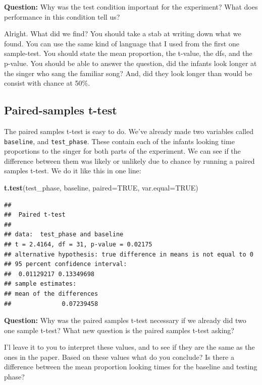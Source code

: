 \documentclass[]{book}
\newenvironment{Shaded}{\begin{snugshade}}{\end{snugshade}}
\newcommand{\KeywordTok}[1]{\textcolor[rgb]{0.13,0.29,0.53}{\textbf{{#1}}}}
\newcommand{\DataTypeTok}[1]{\textcolor[rgb]{0.13,0.29,0.53}{{#1}}}
\newcommand{\OtherTok}[1]{\textcolor[rgb]{0.56,0.35,0.01}{{#1}}}
\newcommand{\NormalTok}[1]{{#1}}
\theoremstyle{definition}
\theoremstyle{definition}
\theoremstyle{definition}
\theoremstyle{remark}
\begin{document}
\textbf{Question:} Why was the test condition important for the
experiment? What does performance in this condition tell us?

Alright. What did we find? You should take a stab at writing down what
we found. You can use the same kind of language that I used from the
first one sample-test. You should state the mean proportion, the
t-value, the dfs, and the p-value. You should be able to answer the
question, did the infants look longer at the singer who sang the
familiar song? And, did they look longer than would be consist with
chance at 50\%.

\subsection{Paired-samples t-test}\label{paired-samples-t-test}

The paired samples t-test is easy to do. We've already made two
variables called \texttt{baseline}, and \texttt{test\_phase}. These
contain each of the infants looking time proportions to the singer for
both parts of the experiment. We can see if the difference between them
was likely or unlikely due to chance by running a paired samples t-test.
We do it like this in one line:

\begin{Shaded}
\begin{Highlighting}[]
\KeywordTok{t.test}\NormalTok{(test_phase, baseline, }\DataTypeTok{paired=}\OtherTok{TRUE}\NormalTok{, }\DataTypeTok{var.equal=}\OtherTok{TRUE}\NormalTok{)}
\end{Highlighting}
\end{Shaded}

\begin{verbatim}
## 
##  Paired t-test
## 
## data:  test_phase and baseline
## t = 2.4164, df = 31, p-value = 0.02175
## alternative hypothesis: true difference in means is not equal to 0
## 95 percent confidence interval:
##  0.01129217 0.13349698
## sample estimates:
## mean of the differences 
##              0.07239458
\end{verbatim}

\textbf{Question:} Why was the paired samples t-test necessary if we
already did two one sample t-test? What new question is the paired
samples t-test asking?

I'l leave it to you to interpret these values, and to see if they are
the same as the ones in the paper. Based on these values what do you
conclude? Is there a difference between the mean proportion looking
times for the baseline and testing phase?
\end{document}
